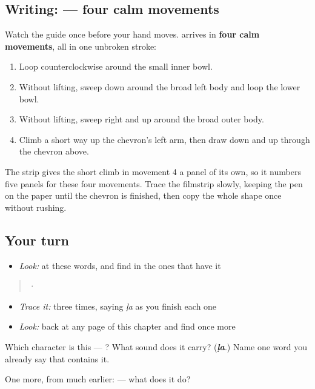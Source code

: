 \subsection*{Writing:  — four calm movements}

Watch the guide once before your hand moves.  arrives in \textbf{four calm movements}, all in one unbroken stroke:

\begin{enumerate}
\raggedright
  \item Loop counterclockwise around the small inner bowl.
  \item Without lifting, sweep down around the broad left body and loop the lower bowl.
  \item Without lifting, sweep right and up around the broad outer body.
  \item Climb a short way up the chevron's left arm, then draw down and up through the chevron above.
\end{enumerate}

The strip gives the short climb in movement 4 a panel of its own, so it numbers five panels for these four movements. Trace the filmstrip slowly, keeping the pen on the paper until the chevron is finished, then copy the whole shape once without rushing.

\subsection*{Your turn}
\begin{itemize}
\raggedright
  \item \emph{Look:} at these words, and find  in the ones that have it
\end{itemize}

\begin{quote}
  ·  
\end{quote}

\begin{itemize}
\raggedright
  \item \emph{Trace it:}  three times, saying \emph{ḷa} as you finish each one
  \item \emph{Look:} back at any page of this chapter and find  once more
\end{itemize}

\begin{tcolorbox}[breakable,colback=teal!4,colframe=teal!35!black,title={Before you move on}]
Which character is this — ? What sound does it carry? (\emph{\textbf{ḷa}}.) Name one word you already say that contains it.

One more, from much earlier:  — what does it do?
\end{tcolorbox}
